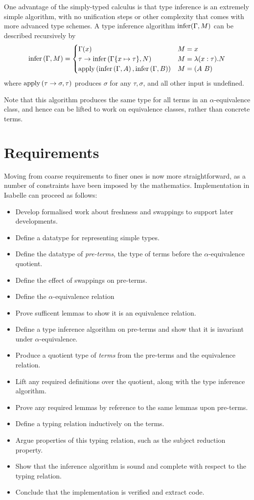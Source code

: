 One advantage of the simply-typed calculus is that type inference is an extremely  simple algorithm, with no unification steps or other complexity that comes with more advanced type schemes.
A type inference algorithm \(\mathrm{infer}(\Gamma, M)\) can be described recursively by
\[
\mathrm{infer}\left(\Gamma, M\right) =
\begin{cases}
\Gamma(x) & M = x\\
\tau \to \mathrm{infer}\left(\Gamma\{x \mapsto \tau\}, N\right) & M = \lambda (x : \tau). N\\
\mathrm{apply}\left(\mathrm{infer}\left(\Gamma, A\right), \mathrm{infer}\left(\Gamma, B\right)\right) & M = \left(A\ B\right)
\end{cases}
\]
where \(\mathrm{apply}\left(\tau \to \sigma, \tau\right)\) produces \(\sigma\) for any \(\tau, \sigma\), and all other input is undefined.

Note that this algorithm produces the same type for all terms in an \(\alpha\)-equivalence class, and hence can be lifted to work on equivalence classes, rather than concrete terms.
\section{Requirements}
Moving from coarse requirements to finer ones is now more straightforward, as a number of constraints have been imposed by the mathematics.
Implementation in Isabelle can proceed as follows:
\begin{itemize}
\item
Develop formalised work about freshness and swappings to support later developments.
\item
Define a datatype for representing simple types.
\item
Define the datatype of \emph{pre-terms}, the type of terms before the \(\alpha\)-equivalence quotient.
\item
Define the effect of swappings on pre-terms.
\item
Define the \(\alpha\)-equivalence relation
\item
Prove sufficent lemmas to show it is an equivalence relation.
\item
Define a type inference algorithm on pre-terms and show that it is invariant under \(\alpha\)-equivalence.
\item
Produce a quotient type of \emph{terms} from the pre-terms and the equivalence relation.
\item
Lift any required definitions over the quotient, along with the type inference algorithm.
\item
Prove any required lemmas by reference to the same lemmas upon pre-terms.
\item
Define a typing relation inductively on the terms.
\item
Argue properties of this typing relation, such as the subject reduction property.
\item
Show that the inference algorithm is sound and complete with respect to the typing relation.
\item
Conclude that the implementation is verified and extract code.
\end{itemize}

